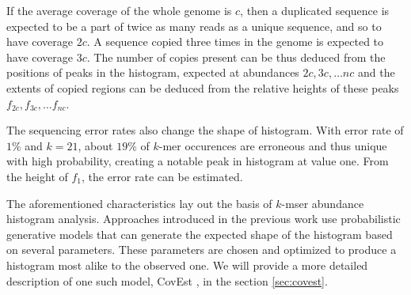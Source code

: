 \medskip

If the average coverage of the whole genome is $c$, then a duplicated sequence is expected 
to be a part of twice as many reads as a unique sequence, and so to have coverage $2c$. 
A sequence copied three times in the genome is expected to have coverage $3c$.
The number of copies present can be thus deduced from the positions of peaks in the histogram,
expected at abundances $2c, 3c, \dots nc$ and the extents of copied regions can be deduced
from the relative heights of these peaks $f_{2c}, f_{3c}, \dots f_{nc}$.

\medskip
 
The sequencing error rates also change the shape of histogram. With error rate of $1\%$ 
and $k=21$, about $19\%$ of $k$-mer occurences are erroneous and thus unique with high probability, 
creating a notable peak in histogram at value one. From the height of $f_1$, the error rate
can be estimated.

\medskip

The aforementioned characteristics lay out the basis of $k$-mser abundance histogram analysis.
Approaches introduced in the previous work \cite{Hozza2015, Williams2013, Melsted2014,
Sivadasan2016} use probabilistic generative models that can generate the
expected shape of the histogram based on several parameters. These parameters are chosen
and optimized to produce a histogram most alike to the observed one.
We will provide a more detailed description of one such model, CovEst \cite{Hozza2015, Hozza2016},
in the section \ref{sec:covest}.
